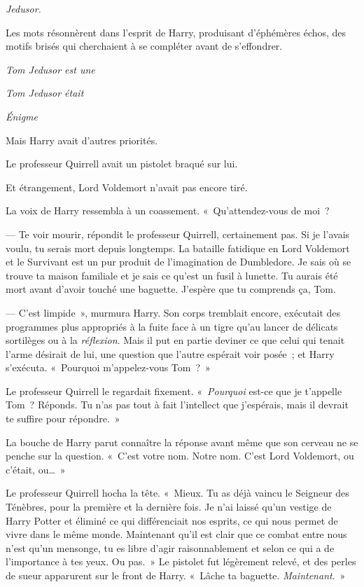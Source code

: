 
 \emph{Jedusor.}

\hplettrineextrapara
Les mots résonnèrent dans l'esprit de Harry, produisant d'éphémères échos, des motifs brisés qui cherchaient à se compléter avant de s'effondrer.

\emph{Tom Jedusor est une}

\emph{Tom Jedusor était}

\emph{Énigme}

Mais Harry avait d'autres priorités.

Le professeur Quirrell avait un pistolet braqué sur lui.

Et étrangement, Lord Voldemort n'avait pas encore tiré.

La voix de Harry ressembla à un coassement.
«~Qu'attendez-vous de moi~?

--- Te voir mourir, répondit le professeur Quirrell, certainement pas. Si je l'avais voulu, tu serais mort depuis longtemps. La bataille fatidique en Lord Voldemort et le Survivant est un pur produit de l'imagination de Dumbledore. Je sais où se trouve ta maison familiale et je sais ce qu'est un fusil à lunette. Tu aurais été mort avant d'avoir touché une baguette. J'espère que tu comprends ça, Tom.

--- C'est limpide~», murmura Harry. Son corps tremblait encore, exécutait des programmes plus appropriés à la fuite face à un tigre qu'au lancer de délicats sortilèges ou à la \emph{réflexion}. Mais il put en partie deviner ce que celui qui tenait l'arme désirait de lui, une question que l'autre espérait voir posée~; et Harry s'exécuta. «~Pourquoi m'appelez-vous Tom~?~»

Le professeur Quirrell le regardait fixement. «~\emph{Pourquoi} est-ce que je t'appelle Tom~? Réponds. Tu n'as pas tout à fait l'intellect que j'espérais, mais il devrait te suffire pour répondre.~»

La bouche de Harry parut connaître la réponse avant même que son cerveau ne se penche sur la question. «~C'est votre nom. Notre nom. C'est Lord Voldemort, ou c'était, ou…~»

Le professeur Quirrell hocha la tête. «~Mieux. Tu as déjà vaincu le Seigneur des Ténèbres, pour la première et la dernière fois. Je n'ai laissé qu'un vestige de Harry Potter et éliminé ce qui différenciait nos esprits, ce qui nous permet de vivre dans le même monde. Maintenant qu'il est clair que ce combat entre nous n'est qu'un mensonge, tu es libre d'agir raisonnablement et selon ce qui a de l'importance à tes yeux. Ou pas.~» Le pistolet fut légèrement relevé, et des perles de sueur apparurent sur le front de Harry. «~Lâche ta baguette. \emph{Maintenant}.~»

